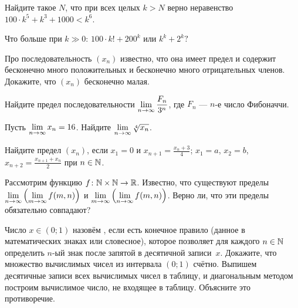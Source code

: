 \documentclass[a4paper,12pt]{article}
\begin{document}
Найдите такое $N$, что при всех целых $k>N$
верно неравенство $100\cdot k^5+k^3+1000< k^6$.

 Что больше при $k \gg 0$: $100 \cdot k! + 200^k$ или $k^k + 2^k?$






Про последовательность $(x_n)$ известно, что она имеет предел и содержит бесконечно много положительных и бесконечно много отрицательных членов. Докажите, что $(x_n)$ бесконечно малая.
%






Найдите предел последовательности $\lim\limits_{n \rightarrow \infty}\dfrac{F_n}{3^n}$, где $F_n$ --- $n$-е число Фибоначчи.


Пусть $\lim\limits_{n \rightarrow \infty} x_n = 16$. Найдите $\lim\limits_{n \rightarrow \infty}\sqrt[4]{x_n}$.


Найдите предел $(x_n)$, если
 $x_1=0$ и $x_{n+1}=\frac{x_n+3}4$;
 $x_1=a$, $x_2=b$, $x_{n+2}=\frac{x_{n+1}+x_n}2$ при $n\in\mathbb{N}$.



Рассмотрим функцию $f \colon \mathbb{N} \times \mathbb{N} \rightarrow \mathbb{R}$. Известно, что существуют пределы\break $\lim\limits_{n \rightarrow \infty}\left( \lim\limits_{m \rightarrow \infty} f(m, n)\right)$ и $\lim\limits_{m \rightarrow \infty}\left( \lim\limits_{n \rightarrow \infty} f(m, n)\right)$. Верно ли, что эти пределы обязательно совпадают?


Число $x\in(0;1)$ назов\"ем , если есть
конечное правило (данное в математических знаках или
словесное), которое позволяет для каждого $n\in\mathbb{N}$
определить $n$-ый знак после запятой в десятичной записи~$x$.
 Докажите, что множество вычислимых чисел из интервала $(0;1)$ сч\"етно.
Выпишем десятичные записи всех вычислимых чисел
в таблицу, и диагональным методом построим вычислимое число, не входящее в таблицу.
Объясните это противоречие.
\end{document}
